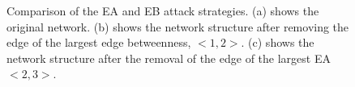 \documentclass[aps,prl,twocolumn,showpacs,superscriptaddress,groupedaddress]{revtex4}  %
\begin{document}
\begin{figure}[htbp]
\begin{center}
{{
}
}
\caption{Comparison of the EA and EB attack strategies. (a) shows the original network. (b) shows the network structure after removing the edge of the largest edge betweenness, $<1, 2>$. (c) shows the network structure after the removal of the edge of the largest EA $<2, 3>$.} \label{fig:4}
\end{center}
\end{figure}

\end{document}
